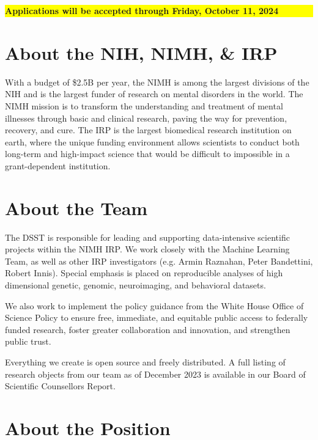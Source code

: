 \documentclass[11pt,letterpaper]{article}
\begin{document}
\begin{center}
\colorbox{yellow}{\parbox{0.8\textwidth}{\centering\textbf{\large Applications will be accepted through Friday, October 11, 2024}}}
\end{center}
\small
\begin{multicols}{2}
\section*{About the NIH, NIMH, \& IRP}
With a budget of \$2.5B per year, the NIMH is among the largest divisions of the NIH and is the largest funder of research on mental disorders in the world. The NIMH mission is to transform the understanding and treatment of mental illnesses through basic and clinical research, paving the way for prevention, recovery, and cure. The IRP is the largest biomedical research institution on earth, where the unique funding environment allows scientists to conduct both long-term and high-impact science that would be difficult to impossible in a grant-dependent institution.

\section*{About the Team}
The DSST is responsible for leading and supporting data-intensive scientific projects within the NIMH IRP. We work closely with the Machine Learning Team, as well as other IRP investigators (e.g. Armin Raznahan, Peter Bandettini, Robert Innis). Special emphasis is placed on reproducible analyses of high dimensional genetic, genomic, neuroimaging, and behavioral datasets.

We also work to implement the policy guidance from the White House Office of Science Policy to ensure free, immediate, and equitable public access to federally funded research, foster greater collaboration and innovation, and strengthen public trust.

Everything we create is open source and freely distributed. A full listing of research objects from our team as of December 2023 is available in our Board of Scientific Counsellors Report.

\section*{About the Position}

\end{multicols}
\end{document}
